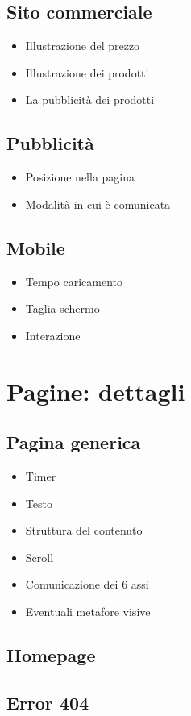 			\subsection*{Sito commerciale}
				\begin{itemize}
					\item Illustrazione del prezzo
					\item Illustrazione dei prodotti
					\item La pubblicità dei prodotti
				\end{itemize}
			
			\subsection*{Pubblicità}
				\begin{itemize}
					\item Posizione nella pagina
					\item Modalità in cui è comunicata
				\end{itemize}
			
			\subsection*{Mobile}
				\begin{itemize}
					\item Tempo caricamento
					\item Taglia schermo
					\item Interazione
				\end{itemize}
				
		
	\section{Pagine: dettagli}
		\subsection*{Pagina generica}
				
				\begin{itemize}
					\item Timer
					\item Testo
					\item Struttura del contenuto
					\item Scroll
					\item Comunicazione dei 6 assi 
					\item Eventuali metafore visive
				\end{itemize}
				
			\subsection*{Homepage}
			\subsection*{Error 404}
	